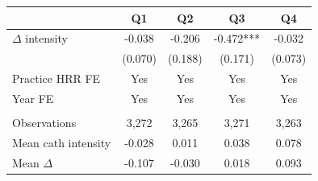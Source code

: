 
\begin{tabular}{lcccc}
\toprule
 & Q1 & Q2 & Q3 & Q4\\
\midrule
$\Delta$ intensity & -0.038 & -0.206 & -0.472*** & -0.032\\
 & (0.070) & (0.188) & (0.171) & (0.073)\\
\addlinespace
Practice HRR FE & Yes & Yes & Yes & Yes\\
Year FE & Yes & Yes & Yes & Yes\\
\midrule\\
Observations & 3,272 & 3,265 & 3,271 & 3,263\\
Mean cath intensity & -0.028 & 0.011 & 0.038 & 0.078\\
Mean $\Delta$ & -0.107 & -0.030 & 0.018 & 0.093\\
\bottomrule
\end{tabular}
